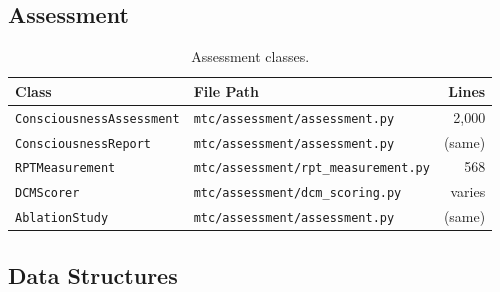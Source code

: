 \subsection{Assessment}

\begin{table}[ht]
\centering
\small
\begin{tabular}{@{}llr@{}}
\toprule
\textbf{Class} & \textbf{File Path} & \textbf{Lines} \\
\midrule
\texttt{ConsciousnessAssessment} & \texttt{mtc/assessment/assessment.py}        & 2{,}000 \\
\texttt{ConsciousnessReport}     & \texttt{mtc/assessment/assessment.py}        & (same) \\
\texttt{RPTMeasurement}          & \texttt{mtc/assessment/rpt\_measurement.py}  & 568 \\
\texttt{DCMScorer}               & \texttt{mtc/assessment/dcm\_scoring.py}      & varies \\
\texttt{AblationStudy}           & \texttt{mtc/assessment/assessment.py}        & (same) \\
\bottomrule
\end{tabular}
\caption{Assessment classes.}
\label{tab:assessment-files}
\end{table}

\subsection{Data Structures}


